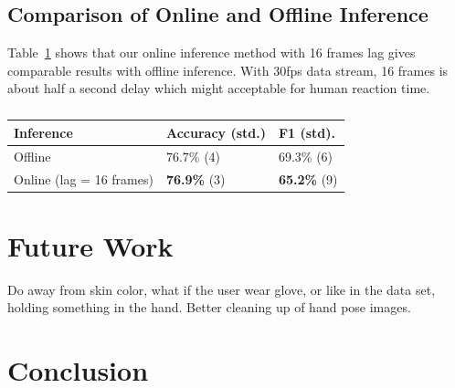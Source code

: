\documentclass{sigchi}
\newcommand\tabhead[1]{\small\textbf{#1}}
\begin{document}
\subsection{Comparison of Online and Offline Inference}
Table~\ref{tab:inference} shows that our online inference method with 16
frames lag gives comparable results with offline inference. With 30fps data
stream, 16 frames is about half a second delay which might acceptable for human
reaction time.

\begin{table}[t]
\centering
\begin{tabular}{|l|l|l|}
\hline
\tabhead{Inference} & {\tabhead{Accuracy (std.)}} & {\tabhead{F1 (std).}}\\
\hline
Offline & 76.7\% (4) & 69.3\% (6) \\
\hline
Online (lag = 16 frames) & \textbf{76.9\%} (3) & \textbf{65.2\%} (9) \\ 
\hline
\end{tabular}
\caption{}
\label{tab:inference}
\end{table}


\section{Future Work}
Do away from skin color, what if the user wear glove, or like in the data set,
holding something in the hand. Better cleaning up of hand pose images.

\section{Conclusion}


%
%
%
%
%
\balance



\end{document}

